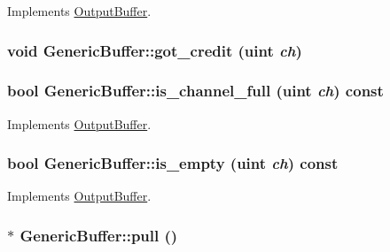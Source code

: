 Implements \hyperlink{classOutputBuffer_bafd65458146d9b383643fef94b38881}{OutputBuffer}.\hypertarget{classGenericBuffer_61f0e9249ca38d149372bdd74906f2a7}{
\subsubsection[{got\_\-credit}]{\setlength{\rightskip}{0pt plus 5cm}void GenericBuffer::got\_\-credit ({\bf uint} {\em ch})}}
\label{classGenericBuffer_61f0e9249ca38d149372bdd74906f2a7}


\hypertarget{classGenericBuffer_91aa6e2af039aa6c1a50a599fc3f3203}{
\subsubsection[{is\_\-channel\_\-full}]{\setlength{\rightskip}{0pt plus 5cm}bool GenericBuffer::is\_\-channel\_\-full ({\bf uint} {\em ch}) const}}
\label{classGenericBuffer_91aa6e2af039aa6c1a50a599fc3f3203}




Implements \hyperlink{classOutputBuffer_23aaeb2aa62e944596d50a569ed5d859}{OutputBuffer}.\hypertarget{classGenericBuffer_94742936925e0b4873dd270aed2c326d}{
\subsubsection[{is\_\-empty}]{\setlength{\rightskip}{0pt plus 5cm}bool GenericBuffer::is\_\-empty ({\bf uint} {\em ch}) const}}
\label{classGenericBuffer_94742936925e0b4873dd270aed2c326d}




Implements \hyperlink{classOutputBuffer_7cba09e2dbb3794d873862b5066fd085}{OutputBuffer}.\hypertarget{classGenericBuffer_6ce6f151eb6f65ec1fffafffb04a8f0e}{
\subsubsection[{pull}]{ $\ast$ GenericBuffer::pull ()}}
\label{classGenericBuffer_6ce6f151eb6f65ec1fffafffb04a8f0e}




